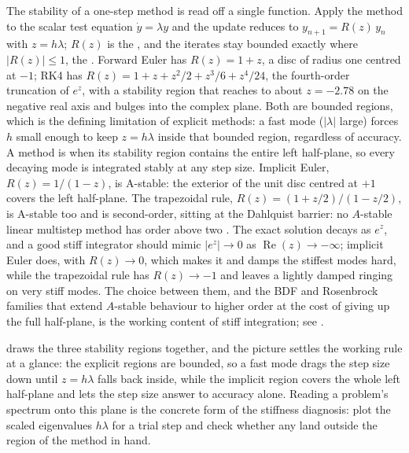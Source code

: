 \begin{mastery}
The stability of a one-step method is read off a single function.
Apply the method to the scalar test equation $\dot{y} = \lambda y$
and the update reduces to $y_{n+1} = R(z)\, y_{n}$ with $z = h\lambda$;
$R(z)$ is the , and the iterates stay
bounded exactly where $|R(z)| \leq 1$, the . Forward Euler has $R(z) = 1 + z$, a disc of radius one
centred at $-1$; RK4 has $R(z) = 1 + z + z^{2}/2 + z^{3}/6 +
z^{4}/24$, the fourth-order truncation of $e^{z}$, with a stability
region that reaches to about $z = -2.78$ on the negative real axis
and bulges into the complex plane. Both are bounded regions, which
is the defining limitation of explicit methods: a fast mode
($|\lambda|$ large) forces $h$ small enough to keep $z = h\lambda$
inside that bounded region, regardless of accuracy. A method is
 when its stability region contains the entire
left half-plane, so every decaying mode is integrated stably at any
step size. Implicit Euler, $R(z) = 1/(1 - z)$, is A-stable: the
exterior of the unit disc centred at $+1$ covers the left
half-plane. The trapezoidal rule, $R(z) = (1 + z/2)/(1 - z/2)$, is
A-stable too and is second-order, sitting at the Dahlquist barrier:
no $A$-stable linear multistep method has order above two
\cite{hist:v2c07-dahlquist-1956}. The exact solution decays as
$e^{z}$, and a good stiff integrator should mimic $|e^{z}| \to 0$ as
$\operatorname{Re}(z) \to -\infty$; implicit Euler does, with
$R(z) \to 0$, which makes it  and damps the
stiffest modes hard, while the trapezoidal rule has $R(z) \to -1$
and leaves a lightly damped ringing on very stiff modes. The choice
between them, and the BDF and Rosenbrock families that extend
$A$-stable behaviour to higher order at the cost of giving up the
full half-plane, is the working content of stiff integration; see
\textcite{text:v2ch07-hairer-wanner-stiff}.
\end{mastery}



 draws the three stability
regions together, and the picture settles the working rule at a glance:
the explicit regions are bounded, so a fast mode drags the step size
down until $z = h\lambda$ falls back inside, while the implicit region
covers the whole left half-plane and lets the step size answer to
accuracy alone. Reading a problem's spectrum onto this plane is the
concrete form of the stiffness diagnosis: plot the scaled eigenvalues
$h\lambda$ for a trial step and check whether any land outside the
region of the method in hand.

